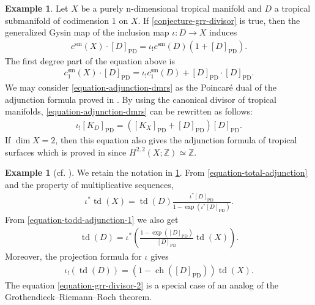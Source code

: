 \documentclass[a4paper,dvipdfmx,reqno,12pt]{amsart}
\theoremstyle{definition}
\newtheorem{example}[theorem]{Example}
\newcommand{\opn}[1]{\operatorname{#1}}
\newcommand{\PD}[1]{[#1]_{\mathrm{PD}}}
\numberwithin{equation}{section}
\begin{document}
\begin{example}
\label{example-grr-1}
Let $X$ be a purely n-dimensional tropical manifold
and $D$ a tropical submanifold of codimension $1$ on 
$X$. If 
\cref{conjecture-grr-divisor} is true, then
the generalized Gysin map of the
inclusion map
$\iota\colon D\to X$ induces
\begin{align}
c^{\mathrm{sm}}(X)\cdot \PD{D}=\iota_!c^{\mathrm{sm}}(D)
(1+\PD{D}).
\end{align}
The first degree part of the equation above is
\begin{align}
\label{equation-adjunction-dmrs}
c^{\mathrm{sm}}_{1}(X)\cdot \PD{D}=\iota_!c^{\mathrm{sm}}_1(D)
+\PD{D}\cdot \PD{D}.
\end{align}
We may consider \cref{equation-adjunction-dmrs} as 
the Poincar\'e dual of the adjunction formula proved in
\cite[Theorem 5.2]{demedrano2023chern}.
By using the canonical divisor of tropical manifolds,
\eqref{equation-adjunction-dmrs} can be rewritten as follows:
\begin{align}
\iota_! \PD{K_D}=(\PD{K_X}+\PD{D})\PD{D}.
\end{align}
If $\dim X=2$, then this equation also gives
the adjunction formula of tropical surfaces which is proved
in \cite[Theorem 4.11]{shaw2015tropical}
since $H^{2,2}(X;\mathbb{Z})\simeq \mathbb{Z}$.
\end{example}

\begin{example}[{cf. \cite[Chapter 13. Appendix]{MR2810322}}]
We retain the notation in \cref{example-grr-1}.
From \eqref{equation-total-adjunction}
and the property of multiplicative sequences, 
\begin{align}
\label{equation-todd-adjunction-1}
\iota^{*}\opn{td}(X)=
\opn{td}(D)\frac{\iota^{*}\PD{D}}
{1-\opn{exp}(\iota^{*}\PD{D})}.
\end{align}
From \cref{equation-todd-adjunction-1} we also get
\begin{align}
\opn{td}(D)
=\iota^{*}\left(
\frac{1-\opn{exp}(\PD{D})}{
\PD{D}}\opn{td}(X)\right).
\end{align}
Moreover, the projection formula for 
$\iota$ gives
\begin{align}
\label{equation-grr-divisor-2}
\iota_!(\opn{td}(D))=(1-\opn{ch}(\PD{D}))\opn{td}(X).
\end{align}
The equation \eqref{equation-grr-divisor-2} 
is a special case of an analog of 
the Grothendieck--Riemann--Roch theorem.
\end{example}
\end{document}
